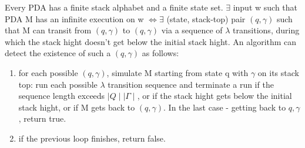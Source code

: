 \documentclass{article}
\begin{document}
Every PDA has a finite stack alphabet and a finite state set. $ \exists $ input w such that PDA M has an infinite execution on w $ \iff \exists $ (state, stack-top) pair $ (q, \gamma) $ such that M can transit from $ (q, \gamma) $ to $ (q, \gamma) $ via a sequence of $ \lambda $ transitions, during which the stack hight doesn't get below the initial stack hight. An algorithm can detect the existence of such a $ (q, \gamma) $ as follows:
\begin{enumerate}
	\item for each possible $ (q, \gamma) $, simulate M starting from state q with $ \gamma $ on its stack top: run each possible $ \lambda $ transition sequence and terminate a run if the sequence length exceeds $ \mid Q \mid \mid \Gamma \mid $, or if the stack hight gets below the initial stack hight, or if M gets back to $ (q, \gamma) $. In the last case - getting back to $ q, \gamma $, return true.
	\item if the previous loop finishes, return false.
\end{enumerate}
\end{document}
